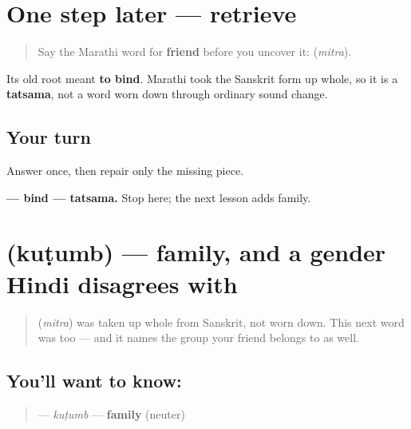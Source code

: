\section[\texorpdfstring{\mr{मित्र} (mitra)}{मित्र (mitra)}]{One step later — retrieve }

\label{lesson:MR-R11-mitra-r1}



\begin{quote}
Say the Marathi word for \textbf{friend} before you uncover it: \textbf{} (\emph{mitra}).
\end{quote}

\begin{grammarlens}[title={What you've built}]
Its old root meant \textbf{to bind}. Marathi took the Sanskrit form up whole, so it is a \textbf{tatsama}, not a word worn down through ordinary sound change.
\end{grammarlens}

\subsection*{Your turn}
Answer once, then repair only the missing piece.

\begin{tcolorbox}[breakable,colback=teal!4,colframe=teal!35!black,title={Before you move on}]
\textbf{ — bind — tatsama.} Stop here; the next lesson adds family.
\end{tcolorbox}
\section[\texorpdfstring{\mr{कुटुंब} (kuṭumb)}{कुटुंब (kuṭumb)}]{ (kuṭumb) — family, and a gender Hindi disagrees with}

\label{lesson:MR-C11-kutumb}



\begin{quote}
\textbf{} (\emph{mitra}) was taken up whole from Sanskrit, not worn down. This next word was too — and it names the group your friend belongs to as well.
\end{quote}

\subsection*{You'll want to know: }
\begin{quote}
\textbf{} — \emph{kuṭumb} — \textbf{family} (neuter)
\end{quote}

